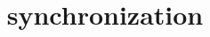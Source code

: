 \graphicspath{{./figures/}}
\title{synchronization}
\date{}

\begin{frame}
    \titlepage
\end{frame}





